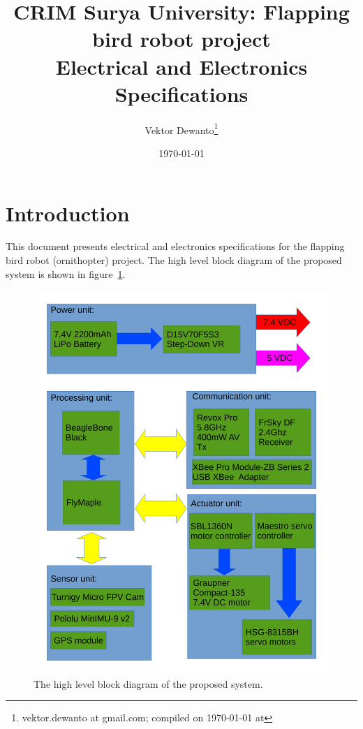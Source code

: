 \documentclass[a4paper, 10pt, twocolumn, titlepage]{article}
\title{CRIM Surya University: Flapping bird robot project \\ Electrical and Electronics Specifications }
\author{Vektor Dewanto\footnote{vektor.dewanto at gmail.com; compiled on {\ddmmyyyydate\today} at \currenttime}}
\date{\today}
\begin{document}
\maketitle
\tableofcontents

\section{Introduction}
This document presents electrical and electronics specifications for the flapping bird robot (ornithopter) project.
The high level block diagram of the proposed system is shown in figure~\ref{fig:hi-level_diagram}.

\begin{figure}[!tb]
  \centering
  \includegraphics[scale=.50]{hi-level_diagram}
  \caption{The high level block diagram of the proposed system.}
  \label{fig:hi-level_diagram}
\end{figure}
\end{document}
